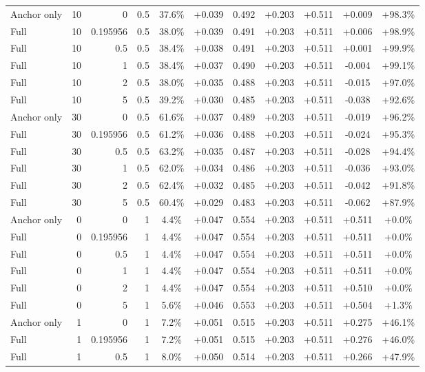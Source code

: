 \begin{table}[htbp]
\begin{tabular}{lrrrccccccc}
Anchor only & 10 & 0 & 0.5 & 37.6\% & +0.039 & 0.492 & +0.203 & +0.511 & +0.009 & +98.3\% \\
Full & 10 & 0.195956 & 0.5 & 38.0\% & +0.039 & 0.491 & +0.203 & +0.511 & +0.006 & +98.9\% \\
Full & 10 & 0.5 & 0.5 & 38.4\% & +0.038 & 0.491 & +0.203 & +0.511 & +0.001 & +99.9\% \\
Full & 10 & 1 & 0.5 & 38.4\% & +0.037 & 0.490 & +0.203 & +0.511 & -0.004 & +99.1\% \\
Full & 10 & 2 & 0.5 & 38.0\% & +0.035 & 0.488 & +0.203 & +0.511 & -0.015 & +97.0\% \\
Full & 10 & 5 & 0.5 & 39.2\% & +0.030 & 0.485 & +0.203 & +0.511 & -0.038 & +92.6\% \\
Anchor only & 30 & 0 & 0.5 & 61.6\% & +0.037 & 0.489 & +0.203 & +0.511 & -0.019 & +96.2\% \\
Full & 30 & 0.195956 & 0.5 & 61.2\% & +0.036 & 0.488 & +0.203 & +0.511 & -0.024 & +95.3\% \\
Full & 30 & 0.5 & 0.5 & 63.2\% & +0.035 & 0.487 & +0.203 & +0.511 & -0.028 & +94.4\% \\
Full & 30 & 1 & 0.5 & 62.0\% & +0.034 & 0.486 & +0.203 & +0.511 & -0.036 & +93.0\% \\
Full & 30 & 2 & 0.5 & 62.4\% & +0.032 & 0.485 & +0.203 & +0.511 & -0.042 & +91.8\% \\
Full & 30 & 5 & 0.5 & 60.4\% & +0.029 & 0.483 & +0.203 & +0.511 & -0.062 & +87.9\% \\
Anchor only & 0 & 0 & 1 & 4.4\% & +0.047 & 0.554 & +0.203 & +0.511 & +0.511 & +0.0\% \\
Full & 0 & 0.195956 & 1 & 4.4\% & +0.047 & 0.554 & +0.203 & +0.511 & +0.511 & +0.0\% \\
Full & 0 & 0.5 & 1 & 4.4\% & +0.047 & 0.554 & +0.203 & +0.511 & +0.511 & +0.0\% \\
Full & 0 & 1 & 1 & 4.4\% & +0.047 & 0.554 & +0.203 & +0.511 & +0.511 & +0.0\% \\
Full & 0 & 2 & 1 & 4.4\% & +0.047 & 0.554 & +0.203 & +0.511 & +0.510 & +0.0\% \\
Full & 0 & 5 & 1 & 5.6\% & +0.046 & 0.553 & +0.203 & +0.511 & +0.504 & +1.3\% \\
Anchor only & 1 & 0 & 1 & 7.2\% & +0.051 & 0.515 & +0.203 & +0.511 & +0.275 & +46.1\% \\
Full & 1 & 0.195956 & 1 & 7.2\% & +0.051 & 0.515 & +0.203 & +0.511 & +0.276 & +46.0\% \\
Full & 1 & 0.5 & 1 & 8.0\% & +0.050 & 0.514 & +0.203 & +0.511 & +0.266 & +47.9\% \\

\end{tabular}
\end{table}
